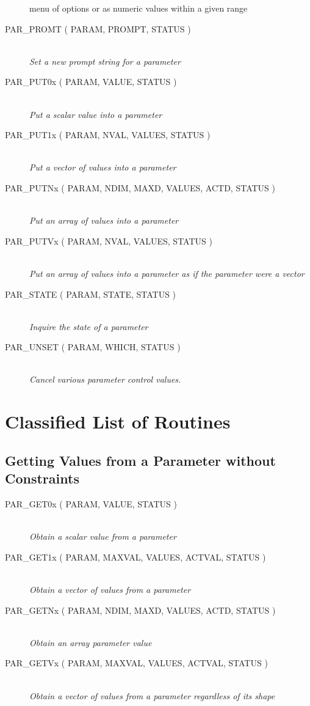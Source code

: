 \documentclass[twoside,11pt]{article}
\newcommand{\htmlref}[2]{#1}
\newcommand{\xlabel}[1]{}
\newcommand{\listline}{\hspace{1pt}\\}
\newcommand{\listline}{}
\begin{document}
\begin{description}
{            menu of options or as numeric values within a given range}
\item [\htmlref{PAR\_PROMT}{PAR_PROMT} 
( PARAM, PROMPT, STATUS )] \listline
\textit{Set a new prompt string for a parameter}
\item [\htmlref{PAR\_PUT0x}{PAR_PUT0x} 
( PARAM, VALUE, STATUS )] \listline
\textit{Put a scalar value into a parameter}
\item [\htmlref{PAR\_PUT1x}{PAR_PUT1x} 
( PARAM, NVAL, VALUES, STATUS )] \listline
\textit{Put a vector of values into a parameter}
\item [\htmlref{PAR\_PUTNx}{PAR_PUTNx} 
( PARAM, NDIM, MAXD, VALUES, ACTD, STATUS )] \listline
\textit{Put an array of values into a parameter}
\item [\htmlref{PAR\_PUTVx}{PAR_PUTVx} 
( PARAM, NVAL, VALUES, STATUS )] \listline
\textit{Put an array of values into a parameter as if the parameter were a vector}
\item [\htmlref{PAR\_STATE}{PAR_STATE} 
( PARAM, STATE, STATUS )] \listline
\textit{Inquire the state of a parameter}
\item [\htmlref{PAR\_UNSET}{PAR_UNSET} 
( PARAM, WHICH, STATUS )] \listline
\textit{Cancel various parameter control values.}
\end{description}

\section{\xlabel{classified_list_of_routines}Classified List of Routines}
\subsection{\xlabel{getting_values_from_a_parameter_without_constraints}Getting Values from a Parameter without Constraints}
\begin{description}
\item [\htmlref{PAR\_GET0x}{PAR_GET0x} 
( PARAM, VALUE, STATUS )] \listline
\textit{Obtain a scalar value from a parameter}
\item [\htmlref{PAR\_GET1x}{PAR_GET1x} 
( PARAM, MAXVAL, VALUES, ACTVAL, STATUS )] \listline
\textit{Obtain a vector of values from a parameter}
\item [\htmlref{PAR\_GETNx}{PAR_GETNx} 
( PARAM, NDIM, MAXD, VALUES, ACTD, STATUS )] \listline
\textit{Obtain an array parameter value}
\item [\htmlref{PAR\_GETVx}{PAR_GETVx} 
( PARAM, MAXVAL, VALUES, ACTVAL, STATUS )] \listline
\textit{Obtain a vector of values from a parameter regardless of its shape}
\end{description}
\end{document}
